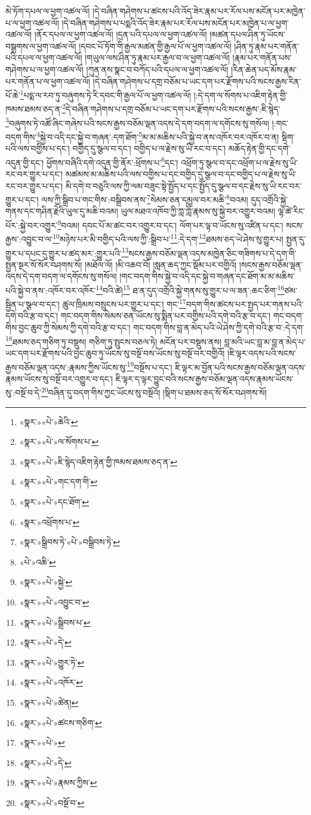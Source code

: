 མེ་ཏོག་དཔལ་ལ་ཕྱག་འཚལ་ལོ། །དེ་བཞིན་གཤེགས་པ་ཚངས་པའི་འོད་ཟེར་རྣམ་པར་རོལ་པས་མངོན་པར་མཁྱེན་པ་ལ་ཕྱག་འཚལ་ལོ། །དེ་བཞིན་གཤེགས་པ་པདྨའི་འོད་ཟེར་རྣམ་པར་རོལ་པས་མངོན་པར་མཁྱེན་པ་ལ་ཕྱག་འཚལ་ལོ། །ནོར་དཔལ་ལ་ཕྱག་འཚལ་ལོ། །དྲན་པའི་དཔལ་ལ་ཕྱག་འཚལ་ལོ། །མཚན་དཔལ་ཤིན་ཏུ་ཡོངས་བསྒྲགས་ལ་ཕྱག་འཚལ་ལོ། །དབང་པོ་ཏོག་གི་རྒྱལ་མཚན་གྱི་རྒྱལ་པོ་ལ་ཕྱག་འཚལ་ལོ། །ཤིན་ཏུ་རྣམ་པར་གནོན་པའི་དཔལ་ལ་ཕྱག་འཚལ་ལོ། །གཡུལ་ལས་ཤིན་ཏུ་རྣམ་པར་རྒྱལ་བ་ལ་ཕྱག་འཚལ་ལོ། །རྣམ་པར་གནོན་པས་གཤེགས་པ་ལ་ཕྱག་འཚལ་ལོ། །ཀུན་ནས་སྣང་བ་བཀོད་པའི་དཔལ་ལ་ཕྱག་འཚལ་ལོ། །རིན་ཆེན་པད་མོས་རྣམ་པར་གནོན་པ་ལ་ཕྱག་འཚལ་ལོ། །དེ་བཞིན་གཤེགས་པ་དགྲ་བཅོམ་པ་ཡང་དག་པར་རྫོགས་པའི་སངས་རྒྱས་རིན་པོ་ཆེ་\footnote{«སྣར་»«པེ་»ཆེའི་}པདྨ་ལ་རབ་ཏུ་བཞུགས་ཏེ་རི་དབང་གི་རྒྱལ་པོ་ལ་ཕྱག་འཚལ་ལོ། །:དེ་དག་ལ་སོགས་པ་འཇིག་རྟེན་གྱི་ཁམས་ཐམས་ཅད་ན་\footnote{«སྣར་»«པེ་»ལ་སོགས་པ་}དེ་བཞིན་གཤེགས་པ་དགྲ་བཅོམ་པ་ཡང་དག་པར་རྫོགས་པའི་སངས་རྒྱས་:ཇི་སྙེད་\footnote{«སྣར་»«པེ་»ཇི་སྙེད་འཇིག་རྟེན་གྱི་ཁམས་ཐམས་ཅད་ན་}བཞུགས་ཏེ་འཚོ་ཞིང་གཞེས་པའི་སངས་རྒྱས་བཅོམ་ལྡན་འདས་དེ་དག་བདག་ལ་དགོངས་སུ་གསོལ། །:གང་བདག་གིས་\footnote{«སྣར་»«པེ་»གང་དག་གི་}སྐྱེ་བ་འདི་དང་སྐྱེ་བ་གཞན་:དག་ཐོག་\footnote{«སྣར་»«པེ་»དང་ཐོག་}མ་མ་མཆིས་པའི་སྐྱེ་བ་ནས་འཁོར་བར་འཁོར་བ་ན། སྡིག་པའི་ལས་བགྱིས་པ་དང་། བགྱིད་དུ་སྩལ་བ་དང་། བགྱིད་པ་ལ་རྗེས་སུ་ཡི་རང་བ་དང་། མཆོད་རྟེན་གྱི་དང་དགེ་འདུན་གྱི་དང་། ཕྱོགས་བཞིའི་དགེ་འདུན་གྱི་ནོར་:ཕྲོགས་པ་\footnote{«སྣར་»འཕྲོགས་པ་}དང་། འཕྲོག་ཏུ་སྩལ་བ་དང་འཕྲོག་པ་ལ་རྗེས་སུ་ཡི་རང་བར་གྱུར་པ་དང་། མཚམས་མ་མཆིས་པའི་ལས་བགྱིས་པ་དང་བགྱིད་དུ་སྩལ་བ་དང་བགྱིད་པ་ལ་རྗེས་སུ་ཡི་རང་བར་གྱུར་པ་དང་། མི་དགེ་བ་བཅུའི་ལས་ཀྱི་ལམ་བཟུང་སྟེ་སྤྱོད་པ་དང་སྤྱོད་དུ་སྩལ་བ་དང་རྗེས་སུ་ཡི་རང་བར་གྱུར་པ་དང་། ལས་ཀྱི་སྒྲིབ་པ་གང་གིས་:བསྒྲིབས་ནས་\footnote{«སྣར་»སྒྲིབས་ཏེ་«པེ་»བསྒྲིབས་ཏེ་}སེམས་ཅན་དམྱལ་བར་མཆི་\footnote{«པེ་»འཆི་}བའམ། དུད་འགྲོའི་སྐྱེ་གནས་དང་གཤིན་རྗེའི་ཡུལ་དུ་མཆི་བའམ། ཡུལ་མཐའ་འཁོབ་ཀྱི་ཀླ་ཀློ་རྣམས་སུ་སྐྱེ་བར་འགྱུར་བའམ། ལྷ་ཚེ་རིང་པོར་:སྐྱེ་བར་འགྱུར་\footnote{«སྣར་»«པེ་»སྐྱེ་}བའམ། དབང་པོ་མ་ཚང་བར་འགྱུར་བ་དང་། ལོག་པར་ལྟ་བ་ཡོངས་སུ་འཛིན་པ་དང་། སངས་རྒྱས་:འབྱུང་བ་ལ་\footnote{«སྣར་»«པེ་»འབྱུང་བ་}མཉེས་པར་མི་བགྱིད་པའི་ལས་ཀྱི་:སྒྲིབ་པ་\footnote{«སྣར་»«པེ་»སྒྲིབས་པ་}:དེ་དག་\footnote{«སྣར་»«པེ་»དེ་}ཐམས་ཅད་ཡེ་ཤེས་སུ་གྱུར་པ། སྤྱན་དུ་གྱུར་པ་དཔང་དུ་གྱུར་པ་ཚད་མར་:གྱུར་པའི་\footnote{«སྣར་»«པེ་»གྱུར་ཏེ་}སངས་རྒྱས་བཅོམ་ལྡན་འདས་མཁྱེན་ཅིང་གཟིགས་པ་དེ་དག་གི་སྤྱན་སྔར་སོ་སོར་བཤགས་སོ། །མཐོལ་ལོ། །མི་འཆབ་བོ། །སླན་ཆད་ཀྱང་སྡོམ་པར་བགྱིའོ། །སངས་རྒྱས་བཅོམ་ལྡན་འདས་དེ་དག་བདག་ལ་དགོངས་སུ་གསོལ། །གང་བདག་གིས་སྐྱེ་བ་འདི་དང་སྐྱེ་བ་གཞན་དང་ཐོག་མ་མ་མཆིས་པའི་སྐྱེ་བ་ནས་:འཁོར་བར་འཁོར་\footnote{«སྣར་»«པེ་»འཁོར་}བའི་ཚེ།\footnote{«སྣར་»«པེ་»ཚེན།} ཐ་ན་དུད་འགྲོའི་སྐྱེ་གནས་སུ་གྱུར་པ་ལ་ཟན་:ཆང་ཅིག་\footnote{«སྣར་»«པེ་»ཚངས་གཅིག་}ཙམ་སྦྱིན་པ་སྩལ་བ་དང་། ཚུལ་ཁྲིམས་བསྲུངས་པར་གྱུར་པ་དང་། གང་\footnote{«སྣར་»«པེ་»}བདག་གིས་ཚངས་པར་སྤྱད་པར་གནས་པའི་དགེ་བའི་རྩ་བ་དང་། གང་བདག་གིས་སེམས་ཅན་ཡོངས་སུ་སྨིན་པར་བགྱིས་པའི་དགེ་བའི་རྩ་བ་དང་། གང་བདག་གིས་བྱང་ཆུབ་ཀྱི་སེམས་ཀྱི་དགེ་བའི་རྩ་བ་དང་། གང་བདག་གིས་བླ་ན་མེད་པའི་ཡེ་ཤེས་ཀྱི་དགེ་བའི་རྩ་བ་:དེ་དག་\footnote{«སྣར་»«པེ་»དེ་}ཐམས་ཅད་གཅིག་ཏུ་བསྡུས། གཅིག་ཏུ་སྤུངས་བཅལ་ཏེ། མངོན་པར་བསྡུས་ནས། བླ་མའི་ཡང་བླ་མ་བླ་ན་མེད་པ་ཡང་དག་པར་རྫོགས་པའི་བྱང་ཆུབ་ཏུ་ཡོངས་སུ་བསྔོ་བས་ཡོངས་སུ་བསྔོ་བར་བགྱིའོ། །ཇི་ལྟར་འདས་པའི་སངས་རྒྱས་བཅོམ་ལྡན་འདས་:རྣམས་ཀྱིས་ཡོངས་སུ་\footnote{«སྣར་»«པེ་»རྣམས་ཀྱིས་}བསྔོས་པ་དང་། ཇི་ལྟར་མ་བྱོན་པའི་སངས་རྒྱས་བཅོམ་ལྡན་འདས་རྣམས་ཡོངས་སུ་བསྔོ་བར་འགྱུར་བ་དང་། ཇི་ལྟར་ད་ལྟར་བྱུང་བའི་སངས་རྒྱས་བཅོམ་ལྡན་འདས་རྣམས་ཡོངས་སུ་:བསྔོ་བ་དེ་\footnote{«སྣར་»«པེ་»བསྔོ་བ་}བཞིན་དུ་བདག་གིས་ཀྱང་ཡོངས་སུ་བསྔོའོ། །སྡིག་པ་ཐམས་ཅད་སོ་སོར་བཤགས་སོ། 